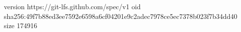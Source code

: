 version https://git-lfs.github.com/spec/v1
oid sha256:49f7b88ed3ee7592e6598a6cf04201e9c2adec7978ce5ec7378b023f7b34dd40
size 174916
